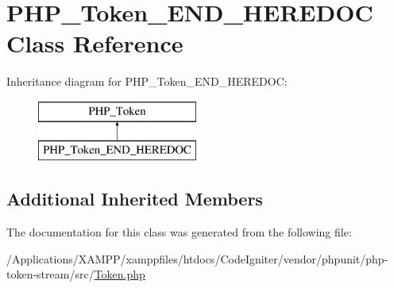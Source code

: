 \hypertarget{class_p_h_p___token___e_n_d___h_e_r_e_d_o_c}{}\section{P\+H\+P\+\_\+\+Token\+\_\+\+E\+N\+D\+\_\+\+H\+E\+R\+E\+D\+OC Class Reference}
\label{class_p_h_p___token___e_n_d___h_e_r_e_d_o_c}
Inheritance diagram for P\+H\+P\+\_\+\+Token\+\_\+\+E\+N\+D\+\_\+\+H\+E\+R\+E\+D\+OC\+:\begin{figure}[H]
\begin{center}
\leavevmode
\includegraphics[height=2.000000cm]{class_p_h_p___token___e_n_d___h_e_r_e_d_o_c}
\end{center}
\end{figure}
\subsection*{Additional Inherited Members}


The documentation for this class was generated from the following file\+:\begin{DoxyCompactItemize}
\item 
/\+Applications/\+X\+A\+M\+P\+P/xamppfiles/htdocs/\+Code\+Igniter/vendor/phpunit/php-\/token-\/stream/src/\mbox{\hyperlink{_token_8php}{Token.\+php}}\end{DoxyCompactItemize}

